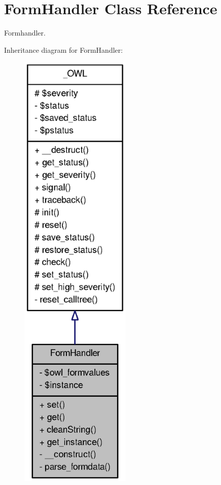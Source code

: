 \section{FormHandler Class Reference}
\label{classFormHandler}


Formhandler.  




Inheritance diagram for FormHandler:\nopagebreak
\begin{figure}[H]
\begin{center}
\leavevmode
\includegraphics[width=150pt]{classFormHandler__inherit__graph}
\end{center}
\end{figure}


